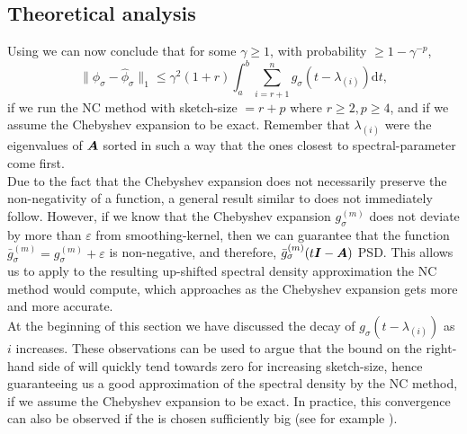 
\subsection{Theoretical analysis}
\label{subsec:3-nystrom-theoretical-analysis}

Using  we can now conclude that for some $\gamma \geq 1$, with probability $\geq 1-\gamma^{-p}$,
\begin{equation}
    \lVert \phi_{\sigma} - \widehat{\phi}_{\sigma} \rVert _1 \leq \gamma^2(1+r) \int_{a}^{b} \sum_{i=r+1}^{n} g_{\sigma}(t - \lambda_{(i)}) \mathrm{d}t,
    \label{equ:3-nystrom-spectral-density-error}
\end{equation}
if we run the \gls{NC} method with \gls{sketch-size} $= r + p$ where $r \geq 2, p \geq 4$,
and if we assume the Chebyshev expansion to be exact. Remember that $\lambda_{(i)}$
were the eigenvalues of $\boldsymbol{A}$ sorted in such a way that the ones closest to
\gls{spectral-parameter} come first.\\

Due to the fact that the Chebyshev
expansion does not necessarily preserve the non-negativity of a function,
a general result similar to  does not immediately follow.
However, if we know that the Chebyshev expansion $g_{\sigma}^{(m)}$ does not
deviate by more than $\varepsilon$ from \gls{smoothing-kernel}, then we can guarantee
that the function $\bar{g}_{\sigma}^{(m)} = g_{\sigma}^{(m)} + \varepsilon$ is
non-negative, and therefore, $\bar{g}_{\sigma}^{(m)}(t\boldsymbol{I} - \boldsymbol{A})$
\gls{PSD}. This allows us to apply  to the
resulting up-shifted spectral density approximation the \gls{NC} method would
compute, which approaches  as the
Chebyshev expansion gets more and more accurate.\\

At the beginning of this section we have discussed the decay of $g_{\sigma}(t - \lambda_{(i)})$
as $i$ increases. These observations can be used to argue that the bound
on the right-hand side of 
will quickly tend towards zero for increasing \gls{sketch-size}, hence guaranteeing us a good approximation of
the spectral density by the \gls{NC} method, if we assume the Chebyshev expansion
to be exact. In practice, this convergence can also be observed if
the  is chosen sufficiently big
(see for example ).

